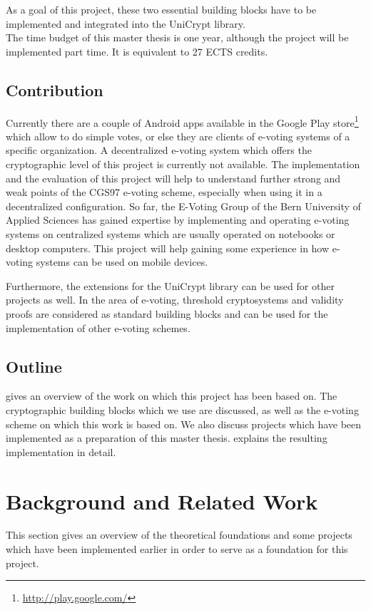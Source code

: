 \documentclass[numbers=noenddot, abstract=on, a4paper, headsepline,
footsepline, oneside, draft=off]{scrreprt}
\begin{document}
As a goal of this project, these two essential building blocks have to be
implemented and integrated into the UniCrypt library.
\\

The time budget of this master thesis is one year, although the project will be
implemented part time. It is equivalent to 27 ECTS credits.

\section{Contribution}
\label{sec:contribution}
Currently there are a couple of Android apps available in the Google Play
store\footnote{\url{http://play.google.com/}} which allow to do simple votes, or
else they are clients of e-voting systems of a specific organization. A
decentralized e-voting system which offers the cryptographic level of this
project is currently not available. The implementation and the evaluation of
this project will help to understand further strong and weak points of the CGS97
e-voting scheme, especially when using it in a decentralized configuration. So
far, the E-Voting Group of the Bern University of Applied Sciences has gained
expertise by implementing and operating e-voting systems on centralized systems
which are usually operated on notebooks or desktop computers. This project will
help gaining some experience in how e-voting systems can be used on mobile
devices.

Furthermore, the extensions for the UniCrypt library can be used for other
projects as well. In the area of e-voting, threshold cryptosystems and validity
proofs are considered as standard building blocks and can be used for the
implementation of other e-voting schemes.

\section{Outline}
 gives an overview of the work on which this project has
been based on. The cryptographic building blocks which we use are discussed,
as well as the e-voting scheme on which this work is based on. We also discuss
projects which have been implemented as a preparation of this master thesis.
 explains the resulting implementation in detail.


\chapter{Background and Related Work}
\label{cha:brw}
This section gives an overview of the theoretical foundations and some projects
which have been implemented earlier in order to serve as a foundation for this
project. 
\end{document}
